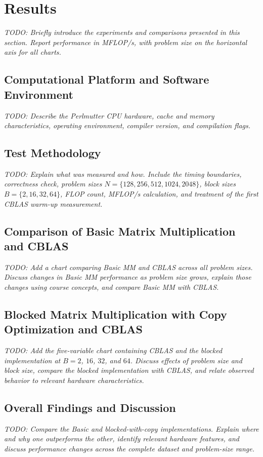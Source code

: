 \section{Results}
\label{sec:results}

\textit{TODO: Briefly introduce the experiments and comparisons presented in
this section. Report performance in MFLOP/s, with problem size on the horizontal
axis for all charts.}

\subsection{Computational Platform and Software Environment}

\textit{TODO: Describe the Perlmutter CPU hardware, cache and memory
characteristics, operating environment, compiler version, and compilation
flags.}

\subsection{Test Methodology}
\label{sec:methodology}

\textit{TODO: Explain what was measured and how. Include the timing boundaries,
correctness check, problem sizes $N=\{128,256,512,1024,2048\}$, block sizes
$B=\{2,16,32,64\}$, FLOP count, MFLOP/s calculation, and treatment of the first
CBLAS warm-up measurement.}

\subsection{Comparison of Basic Matrix Multiplication and CBLAS}

\textit{TODO: Add a chart comparing Basic MM and CBLAS across all problem
sizes. Discuss changes in Basic MM performance as problem size grows, explain
those changes using course concepts, and compare Basic MM with CBLAS.}

\subsection{Blocked Matrix Multiplication with Copy Optimization and CBLAS}

\textit{TODO: Add the five-variable chart containing CBLAS and the blocked
implementation at $B=2$, $16$, $32$, and $64$. Discuss effects of problem size
and block size, compare the blocked implementation with CBLAS, and relate
observed behavior to relevant hardware characteristics.}

\subsection{Overall Findings and Discussion}

\textit{TODO: Compare the Basic and blocked-with-copy implementations. Explain
where and why one outperforms the other, identify relevant hardware features,
and discuss performance changes across the complete dataset and problem-size
range.}
